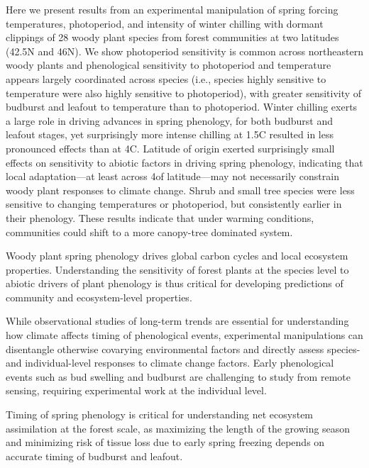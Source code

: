 \documentclass{article}
\begin{document}
{Here we present results from an experimental manipulation of spring forcing temperatures, photoperiod, and intensity of winter chilling with dormant clippings of 28 woody plant species from forest communities at two latitudes (42.5\degree N and 46\degree N). We show photoperiod sensitivity is common across northeastern woody plants and phenological sensitivity to photoperiod and temperature appears largely coordinated across species (i.e., species highly sensitive to temperature were also highly sensitive to photoperiod), with greater sensitivity of budburst and leafout to temperature than to photoperiod. Winter chilling exerts a large role in driving advances in spring phenology, for both budburst and leafout stages, yet surprisingly more intense chilling at 1.5\degree C resulted in less pronounced effects than at 4\degree C. Latitude of origin exerted surprisingly small effects on sensitivity to abiotic factors in driving spring phenology, indicating that local adaptation---at least across 4\degree of latitude---may not necessarily constrain woody plant responses to climate change. Shrub and small tree species were less sensitive to changing temperatures or photoperiod, but consistently earlier in their phenology. These results indicate that under warming conditions, communities could shift to a more canopy-tree dominated system.
}


Woody plant spring phenology drives global carbon cycles and local ecosystem properties. Understanding the sensitivity of forest plants at the species level to abiotic drivers of plant phenology is thus critical for developing predictions of community and ecosystem-level properties. 

While observational studies of long-term trends are essential for understanding how climate affects timing of phenological events, experimental manipulations can disentangle otherwise covarying environmental factors and directly assess species- and individual-level responses to climate change factors. Early phenological events such as bud swelling and budburst are challenging to study from remote sensing, requiring experimental work at the individual level.

Timing of spring phenology is critical for understanding net ecosystem assimilation at the forest scale, as maximizing the length of the growing season and minimizing risk of tissue loss due to early spring freezing depends on accurate timing of budburst and leafout. 
\cite{Basler:2014aa}
\end{document}
